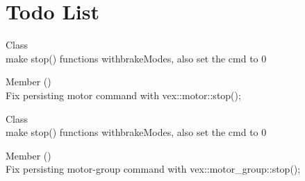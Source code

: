 \chapter{Todo List}
\hypertarget{todo}{}\label{todo}

\begin{DoxyRefList}
\item[Class \doxylink{classart_1_1_simple_motor}{art\+::Simple\+Motor} ]\hfill \\
\label{todo__todo000001}%
%
make stop() functions withbrake\+Modes, also set the cmd to 0  
\item[Member \doxylink{classart_1_1_simple_motor_aa3d8f01a6a434cdb8d6559dfe7b8d642}{art\+::Simple\+Motor\+::get} ()]\hfill \\
\label{todo__todo000002}%
%
Fix persisting motor command with vex\+::motor\+::stop(); 
\item[Class \doxylink{classart_1_1_simple_motor_group}{art\+::Simple\+Motor\+Group} ]\hfill \\
\label{todo__todo000003}%
%
make stop() functions withbrake\+Modes, also set the cmd to 0  
\item[Member \doxylink{classart_1_1_simple_motor_group_ae7e407ee8ae8e4c8456606cc1fcedf47}{art\+::Simple\+Motor\+Group\+::get} ()]\hfill \\
\label{todo__todo000004}%
%
Fix persisting motor-\/group command with vex\+::motor\+\_\+group\+::stop();
\end{DoxyRefList}
